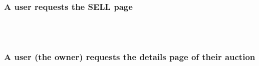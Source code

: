 \documentclass[12pt, a4paper, renqo, final]{amsart}
\begin{document}
			\subsubsection{A user requests the SELL page}
			\phantom{.}\\
			\noindent {}	
			\phantom{.}\\
			\newpage
			\subsubsection{A user (the owner) requests the details page of their auction}
			\phantom{.}\\
			\noindent {}	
			\phantom{.}\\
\end{document}
